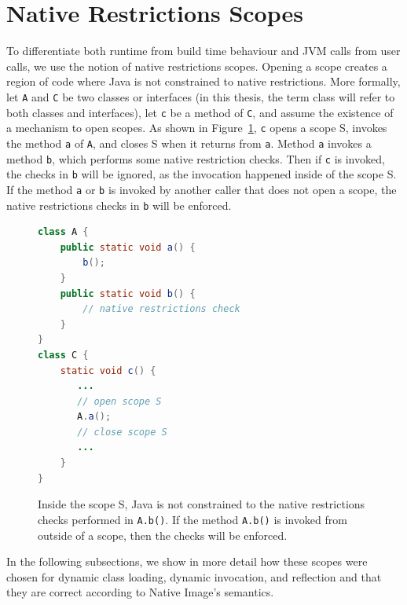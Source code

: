 \section{Native Restrictions Scopes}
To differentiate both runtime from build time behaviour and JVM calls from user calls, we use the notion of native restrictions scopes. Opening a scope creates a region of code where Java is not constrained to native restrictions. 
More formally, let \verb|A| and \verb|C| be two classes or interfaces (in this thesis, the term class will refer to both classes and interfaces), let \verb|c| be a method of \verb|C|, and assume the existence of a mechanism to open scopes. As shown in Figure~\ref{fig:scopes}, \verb|c| opens a scope S, invokes the method \verb|a| of \verb|A|, and closes S when it returns from \verb|a|. Method \verb|a| invokes a method \verb|b|, which performs some native restriction checks.
Then if \verb|c| is invoked, the checks in \verb|b| will be ignored, as the invocation happened inside of the scope S.
If the method \verb|a| or \verb|b| is invoked by another caller that does not open a scope, the native restrictions checks in \verb|b| will be enforced.

\begin{figure}[ht]
    \centering
\begin{lstlisting}[language=Java]
class A {
    public static void a() {
        b(); 
    }
    public static void b() {
        // native restrictions check
    }
} 
class C {
    static void c() {
       ...
       // open scope S
       A.a();
       // close scope S
       ...
    }
}
\end{lstlisting}
    \caption{Inside the scope S, Java is not constrained to the native restrictions checks performed in \texttt{A.b()}. If the method \texttt{A.b()} is invoked from outside of a scope, then the checks will be enforced.}
    \label{fig:scopes}
\end{figure}

In the following subsections, we show in more detail how these scopes were chosen for dynamic class loading, dynamic invocation, and reflection and that they are correct according to Native Image's semantics.

